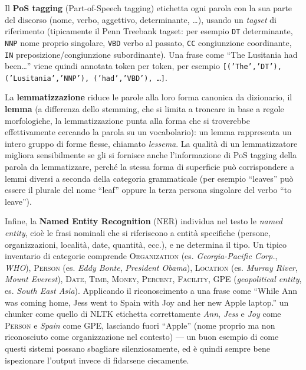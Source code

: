 \documentclass[11pt,a4paper]{report}
\begin{document}
Il \textbf{PoS tagging} (Part-of-Speech tagging) etichetta ogni parola con la sua parte del discorso (nome, verbo, aggettivo, determinante, \ldots), usando un \emph{tagset} di riferimento (tipicamente il Penn Treebank tagset: per esempio \texttt{DT} determinante, \texttt{NNP} nome proprio singolare, \texttt{VBD} verbo al passato, \texttt{CC} congiunzione coordinante, \texttt{IN} preposizione/congiunzione subordinante). Una frase come ``The Lusitania had been\ldots'' viene quindi annotata token per token, per esempio \texttt{[('The','DT'), ('Lusitania','NNP'), ('had','VBD'), \ldots]}.

La \textbf{lemmatizzazione} riduce le parole alla loro forma canonica da dizionario, il \textbf{lemma} (a differenza dello stemming, che si limita a troncare in base a regole morfologiche, la lemmatizzazione punta alla forma che si troverebbe effettivamente cercando la parola su un vocabolario): un lemma rappresenta un intero gruppo di forme flesse, chiamato \emph{lessema}. La qualità di un lemmatizzatore migliora sensibilmente se gli si fornisce anche l'informazione di PoS tagging della parola da lemmatizzare, perché la stessa forma di superficie può corrispondere a lemmi diversi a seconda della categoria grammaticale (per esempio ``leaves'' può essere il plurale del nome ``leaf'' oppure la terza persona singolare del verbo ``to leave'').

Infine, la \textbf{Named Entity Recognition} (NER) individua nel testo le \emph{named entity}, cioè le frasi nominali che si riferiscono a entità specifiche (persone, organizzazioni, località, date, quantità, ecc.), e ne determina il tipo. Un tipico inventario di categorie comprende \textsc{Organization} (es. \emph{Georgia-Pacific Corp.}, \emph{WHO}), \textsc{Person} (es. \emph{Eddy Bonte}, \emph{President Obama}), \textsc{Location} (es. \emph{Murray River}, \emph{Mount Everest}), \textsc{Date}, \textsc{Time}, \textsc{Money}, \textsc{Percent}, \textsc{Facility}, \textsc{GPE} (\emph{geopolitical entity}, es. \emph{South East Asia}). Applicando il riconoscimento a una frase come ``While Ann was coming home, Jess went to Spain with Joy and her new Apple laptop.'' un chunker come quello di NLTK etichetta correttamente \emph{Ann}, \emph{Jess} e \emph{Joy} come \textsc{Person} e \emph{Spain} come \textsc{GPE}, lasciando fuori ``Apple'' (nome proprio ma non riconosciuto come organizzazione nel contesto) --- un buon esempio di come questi sistemi possano sbagliare silenziosamente, ed è quindi sempre bene ispezionare l'output invece di fidarsene ciecamente.
\end{document}
